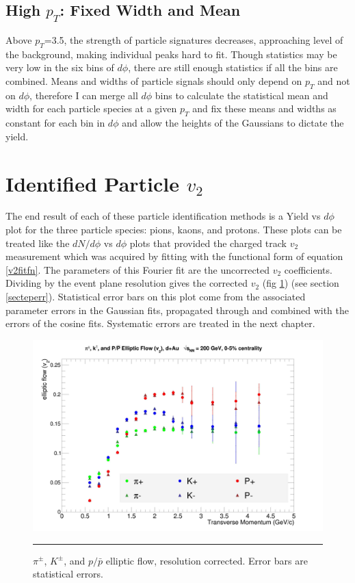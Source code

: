 \subsection{High $p_T$: Fixed Width and Mean}
Above $p_T$=3.5, the strength of particle signatures decreases, approaching level of the background, making individual peaks hard to fit. Though statistics may be very low in the six bins of $d\phi$, there are still enough statistics if all the bins are combined. Means and widths of particle signals should only depend on $p_T$ and not on $d\phi$, therefore I can merge all $d\phi$ bins to calculate the statistical mean and width for each particle species at a given $p_T$ and fix these means and widths as constant for each bin in $d\phi$ and allow the heights of the Gaussians to dictate the yield.

\section{Identified Particle $v_{2}$}
The end result of each of these particle identification methods is a Yield vs $d\phi$ plot for the three particle species: pions, kaons, and protons. These plots can be treated like the $dN/d\phi$ vs $d\phi$ plots that provided the charged track $v_2$ measurement which was acquired by fitting with the functional form of equation \ref{v2fitfn}. The parameters of this Fourier fit are the uncorrected $v_2$ coefficients. Dividing by the event plane resolution gives the corrected $v_2$ (fig \ref{fig:v2all}) (see section \ref{secteperr}). Statistical error bars on this plot come from the associated parameter errors in the Gaussian fits, propagated through and combined with the errors of the cosine fits. Systematic errors are treated in the next chapter.

\begin{figure}[h!]
  \centering
    \includegraphics[width=1\textwidth]{results/v2allnoSE.jpg}
    \rule{35em}{0.5pt}
  \caption[$\pi^{\pm}$, $K^{\pm}$, $p/\bar{p}$ elliptic flow,$\sqrt{s_{NN}}=$200 GeV d+Au collisions]{$\pi^{\pm}$, $K^{\pm}$, and $p/\bar{p}$ elliptic flow, resolution corrected. Error bars are statistical errors.}
  \label{fig:v2all}
\end{figure}

\pagebreak
\pagebreak
